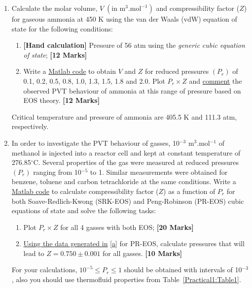 \documentclass[12pts,a4paper,amsmath,amssymb,floatfix]{article}%
\renewcommand\leq{\leqslant}
\begin{document}
\begin{enumerate}[label=\bfseries Problem \arabic*:]
%
     \item\label{Prob1} Calculate the molar volume, $V\;\left(\text{in m}^{3}\text{.mol}^{-1}\right)$ and compressibility factor ($Z$) for gaseous ammonia at 450 K using the van der Waals (vdW) equation of state for the following conditions:
          \begin{enumerate}[label=\bfseries Task \arabic*]
              \item\label{c} {\bf[Hand calculation]} Pressure of 56 atm using the {\it generic cubic equation of state}; \hfill{\bf[12 Marks]}
              \item\label{d} Write a \underline{Matlab code} to obtain $V$ and $Z$ for reduced pressures $\left(P_{r}\right)$ of 0.1, 0.2, 0.5, 0.8, 1.0, 1.3, 1.5, 1.8 and 2.0. Plot $P_{r}\times Z$ and \underline{comment} the observed PVT behaviour of ammonia at this range of pressure based on EOS theory. \hfill{\bf[12 Marks]}
          \end{enumerate}
          Critical temperature and pressure of ammonia are 405.5 K and 111.3 atm, respectively.

     \item\label{Prob2} In order to investigate the PVT behaviour of gasses, 10$^{-3}$ m$^{3}$.mol$^{-1}$ of methanol is injected into a reactor cell and kept at constant temperature of 276.85$^{\circ}$C. Several properties of the gas were measured at reduced pressures $\left(P_{r}\right)$ ranging from 10$^{-5}$ to 1.  Similar measurements were obtained for benzene, toluene and carbon tetrachloride at the same conditions. Write a \underline{Matlab code} to calculate compressibility factor ($Z$) as a function of $P_{r}$ for both Soave-Redlich-Kwong (SRK-EOS) and Peng-Robinson (PR-EOS) cubic equations of state and solve the following tasks:
          \begin{enumerate}[label=\bfseries Task \arabic*]
              \item\label{a} Plot $P_{r}\times Z$ for all 4 gasses with both EOS; \hfill{\bf[20 Marks]} 
              \item\label{b} \underline{Using the data generated in} \ref{a} for PR-EOS, calculate pressures that will lead to $Z=0.750\pm0.001$ for all gasses. \hfill{\bf[10 Marks]} 
          \end{enumerate}
For your calculations, $10^{-5}\leq P_{r}\leq 1$ should be obtained with intervals of 10$^{-3}$, also you should use thermofluid properties from Table~\ref{Practical1:Table1}. 


\end{enumerate}
\end{document}

